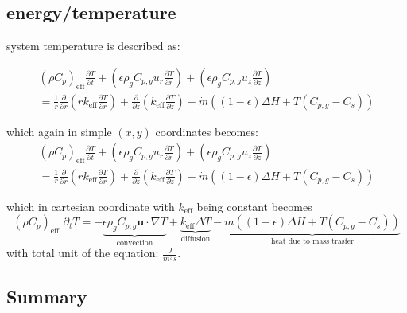 \documentclass{article}
\begin{document}
\subsection*{energy/temperature}
system temperature is described as:

\begin{align*}
    (\rho C_{p} )_{\text{eff}}\frac{\partial T}{\partial t} + (\epsilon \rho_g C_{p,g}u_r \frac{\partial T}{\partial r}) + (\epsilon \rho_g C_{p,g}u_z \frac{\partial T}{\partial z})\\
    = \frac{1}{r}\frac{\partial}{\partial r}\left( rk_{\text{eff}}\frac{\partial T}{\partial r}\right)+\frac{\partial}{\partial z}\left( k_{\text{eff}}\frac{\partial T}{\partial z}\right)-\dot{m}((1-\epsilon)\Delta H+T(C_{p,g}-C_s))
\end{align*}

which again in simple $(x, y)$ coordinates becomes:
\begin{align*}
    (\rho C_{p} )_{\text{eff}}\frac{\partial T}{\partial t} + (\epsilon \rho_g C_{p,g}u_r \frac{\partial T}{\partial r}) + (\epsilon \rho_g C_{p,g}u_z \frac{\partial T}{\partial z})\\
    = \frac{1}{r}\frac{\partial}{\partial r}\left( rk_{\text{eff}}\frac{\partial T}{\partial r}\right)+\frac{\partial}{\partial z}\left( k_{\text{eff}}\frac{\partial T}{\partial z}\right)-\dot{m}((1-\epsilon)\Delta H+T(C_{p,g}-C_s))
\end{align*}

which in cartesian coordinate with $k_{\text{eff}}$ being constant becomes
\begin{equation}
    {(\rho C_{p} )}_{\text{eff}}\,\,{\partial_t T}
    = - \underbrace{\epsilon \rho_g C_{p,g} \mathbf{u}\cdot \nabla T}_{\text{convection}} 
    + \underbrace{k_{\text{eff}}\Delta T}_{\text{diffusion}}
    -\underbrace{\dot{m}((1-\epsilon)\Delta H+T(C_{p,g}-C_s)) }_{\text{heat due to mass trasfer}}
\end{equation}
with total unit of the equation: $\frac{J}{m^3s}$.

\subsection*{Summary}
\end{document}
